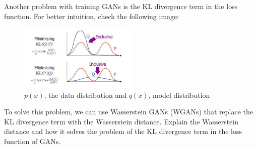 Another problem with training GANs is the KL divergence term in the loss function. For better intuition, check the following image:

\begin{figure}[H]
    \centering
    \includegraphics[width=0.5\textwidth]{gan_problem.png}
    \caption{ $p(x)$, the data distribution and $q(x)$, model distribution}
\end{figure}


To solve this problem, we can use Wasserstein GANs (WGANs) that replace the KL divergence term with the Wasserstein distance. Explain the Wasserstein distance and how it solves the problem of the KL divergence term in the loss function of GANs.
